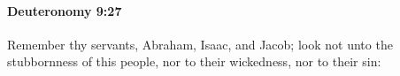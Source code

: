 
		\paragraph{Deuteronomy 9:27} %
			\label{DEUTERONOMY-9-27}

			Remember thy servants, Abraham, Isaac, and Jacob; look not unto the stubbornness of this people, nor to their wickedness, nor to their sin:


